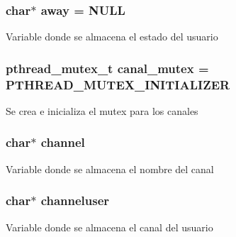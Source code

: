 \subsubsection[{away}]{\setlength{\rightskip}{0pt plus 5cm}char$\ast$ away = N\+U\+L\+L}\label{_g-2361-06-_p1-_server_8c_adf86742e21384f58f8999d8317e6a370}
Variable donde se almacena el estado del usuario \hypertarget{_g-2361-06-_p1-_server_8c_ab86a544a49de18195048bac54dd3ac3e}{}
\subsubsection[{canal\+\_\+mutex}]{\setlength{\rightskip}{0pt plus 5cm}pthread\+\_\+mutex\+\_\+t canal\+\_\+mutex = P\+T\+H\+R\+E\+A\+D\+\_\+\+M\+U\+T\+E\+X\+\_\+\+I\+N\+I\+T\+I\+A\+L\+I\+Z\+E\+R}\label{_g-2361-06-_p1-_server_8c_ab86a544a49de18195048bac54dd3ac3e}
Se crea e inicializa el mutex para los canales \hypertarget{_g-2361-06-_p1-_server_8c_a842ca2f026578e5c479c095ff3335969}{}
\subsubsection[{channel}]{\setlength{\rightskip}{0pt plus 5cm}char$\ast$ channel}\label{_g-2361-06-_p1-_server_8c_a842ca2f026578e5c479c095ff3335969}
Variable donde se almacena el nombre del canal \hypertarget{_g-2361-06-_p1-_server_8c_a55a7bd8f3229706c5917445aba995c5b}{}
\subsubsection[{channeluser}]{\setlength{\rightskip}{0pt plus 5cm}char$\ast$ channeluser}\label{_g-2361-06-_p1-_server_8c_a55a7bd8f3229706c5917445aba995c5b}
Variable donde se almacena el canal del usuario \hypertarget{_g-2361-06-_p1-_server_8c_a26292066ca0d17922eadee4161542ab9}{}
